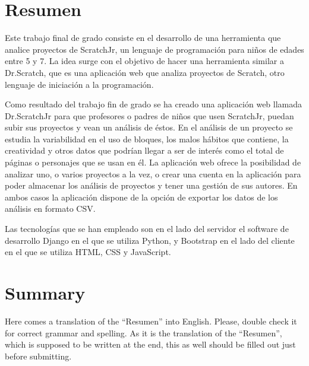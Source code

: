 \documentclass[a4paper, 12pt]{book}
\begin{document}

\chapter*{Resumen}

Este trabajo final de grado consiste en el desarrollo de una herramienta que analice proyectos de ScratchJr, un lenguaje de programación para niños de edades entre 5 y 7.  
La idea surge con el objetivo de hacer una herramienta similar a Dr.Scratch, que es una aplicación web que analiza proyectos de Scratch, otro lenguaje de iniciación a la programación. 

\vspace{5mm}

Como resultado del trabajo fin de grado se ha creado una aplicación web llamada Dr.ScratchJr para que profesores o padres de niños que usen ScratchJr, puedan subir sus proyectos y vean un análisis de éstos.
En el análisis de un proyecto se estudia la variabilidad en el uso de bloques, los malos hábitos que contiene, la creatividad y otros datos que podrían llegar a ser de interés como el total de páginas o personajes que se usan en él. 
La aplicación web ofrece la posibilidad de analizar uno, o varios proyectos a la vez, o crear una cuenta en la aplicación para poder almacenar los análisis de proyectos y tener una gestión de sus autores. 
En ambos casos la aplicación dispone de la opción de exportar los datos de los análisis en formato CSV.

\vspace{5mm}

Las tecnologías que se han empleado son en el lado del servidor el software de desarrollo Django en el que se utiliza Python, y Bootstrap en el lado del cliente en el que se utiliza HTML, CSS y JavaScript.


\chapter*{Summary}

Here comes a translation of the ``Resumen'' into English. 
Please, double check it for correct grammar and spelling.
As it is the translation of the ``Resumen'', which is supposed to be written at the end, this as well should be filled out just before submitting.
\end{document}

